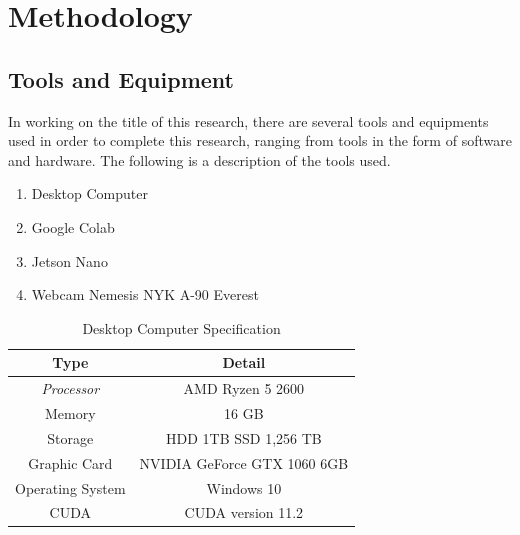 \section{Methodology}
\label{sec:arsitektur}


\subsection{Tools and Equipment}
\label{subsec:toolsandequipment}

\par In working on the title of this research, there are several tools and equipments used in order to complete this research, ranging from tools in the form of software and hardware. The following is a description of the tools used.

\begin{enumerate}[nolistsep]
  \item Desktop Computer
  \item Google Colab
  \item Jetson Nano
  \item Webcam Nemesis NYK A-90 Everest
\end{enumerate}

\begin{table} [ht]
  \caption{Desktop Computer Specification}
  \label{tab:desktopspec}
  \centering
  \begin{tabular}{|c|c|}
    \hline
    \textbf{Type} & \textbf{Detail}  \\
    \hline
    \textit{Processor} & AMD Ryzen 5 2600 \\ 
    Memory             & 16 GB  \\
    Storage            & HDD 1TB SSD 1,256 TB\\
    Graphic Card       & NVIDIA GeForce GTX 1060 6GB \\
    Operating System   & Windows 10     \\
    CUDA               & CUDA version 11.2    \\              
    \hline
  \end{tabular}
\end{table}

